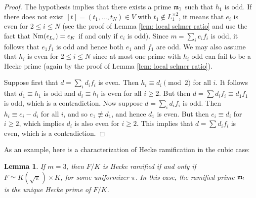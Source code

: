 \documentclass[11pt,a4paper]{amsart}
\def\m{{\rm \mathfrak{m}}}
\def\Nm{{\rm Nm}}
\numberwithin{equation}{section}
\newtheorem{lemma}[theorem]{Lemma}
\begin{document}
\begin{proof}
    The hypothesis implies that there exists a prime $\m_1$ such that $h_1$ is odd. If there does not exist $[t] = (t_1,\ldots, t_N) \in V$ with $t_1 \notin L_1^{\times 2}$, it means that $e_i$ is even for $2\leq i \leq N$ (see the proof of Lemma \ref{lem: local selmer ratio} and use the fact that $\Nm(\epsilon_{L_i}) = \epsilon_K$ if and only if $e_i$ is odd). Since $m = \sum_i e_if_i$ is odd, it follows that $e_1f_1$ is odd and hence both $e_1$ and $f_1$ are odd. We may also assume that $h_i$ is even for $2 \leq i \leq N$ since at most one prime with $h_i$ odd can fail to be a Hecke prime (again by the proof of Lemma \ref{lem: local selmer ratio}).
    
    Suppose first that $d = \sum_i d_i f_i$ is even. Then $h_i \equiv d_i \pmod{2}$ for all $i$. It follows that $d_1 \equiv h_1$ is odd and $d_i \equiv h_i$ is even for all $i \geq 2$. But then $d  = \sum d_if_i \equiv d_1f_1$ is odd, which is a contradiction. Now suppose $d = \sum_i d_if_i$ is odd.  Then $h_i \equiv e_i - d_i$ for all $i$, and so $e_1 \not\equiv d_1$, and hence $d_1$ is even. But then $e_i \equiv d_i$ for $i \geq 2$, which implies $d_i$ is also even for $i \geq 2$. This implies that $d = \sum d_if_i$ is even, which is a contradiction.  
\end{proof}

As an example, here is a characterization of Hecke ramification in the cubic case: 

\begin{lemma}\label{lem: cubic characterization}
If $m = 3$, then $F/K$ is Hecke ramified if and only if $F \simeq K(\sqrt{\pi}) \times K$, for some uniformizer $\pi$. In this case, the ramified prime $\m_1$ is the unique Hecke prime of $F/K$.    
\end{lemma}
\end{document}
